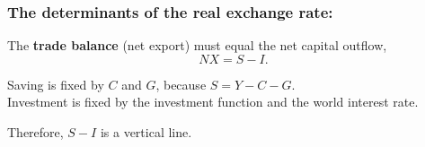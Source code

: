 \documentclass[12pt]{article}
\begin{document}
\begin{figure}[H]
\end{figure}




\subsubsection{The determinants of the real exchange rate:}

The {\textbf {trade balance}} (net export) must equal the net capital outflow,
\begin{equation*}
NX = S - I.
\end{equation*}

Saving is fixed by $ C $ and $ G $, because $ S = Y - C - G $.\\
Investment is fixed by the investment function and the world interest rate.

Therefore, $ S - I $ is a vertical line.

\begin{figure}[H]
\end{figure}
\end{document}
